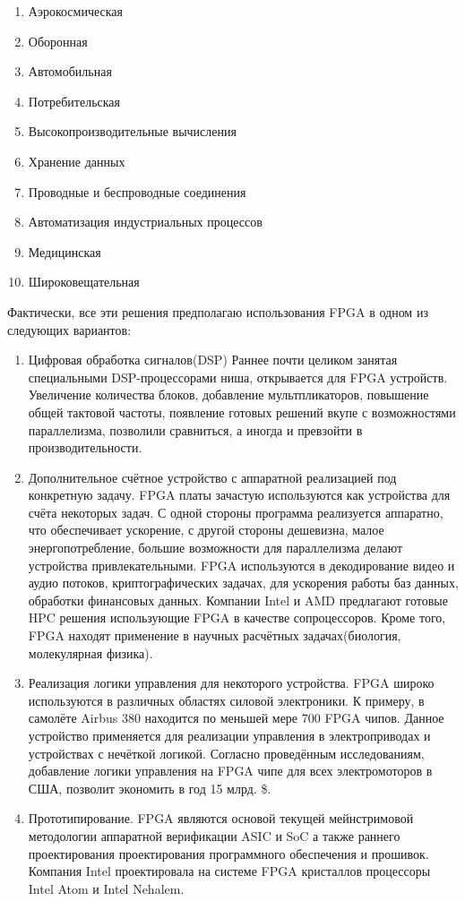 \begin{enumerate}
	\item Аэрокосмическая
	\item Оборонная
	\item Автомобильная
	\item Потребительская
	\item Высокопроизводительные вычисления
	\item Хранение данных
	\item Проводные и беспроводные соединения
	\item Автоматизация индустриальных процессов
	\item Медицинская
	\item Широковещательная
\end{enumerate}

Фактически, все эти решения предполагаю использования FPGA в одном из следующих
вариантов:

\begin{enumerate}
  \item Цифровая обработка сигналов(DSP)
  		Раннее почти целиком занятая специальными DSP-процессорами ниша, открывается
  		для FPGA устройств. Увеличение количества блоков, добавление
  		мультпликаторов, повышение общей тактовой частоты, появление готовых решений
  		вкупе с возможностями параллелизма, позволили сравниться, а иногда и превзойти в
  		производительности. 
  \item Дополнительное счётное устройство с аппаратной реализацией под
  		конкретную задачу.
  		FPGA платы зачастую используются как устройства для счёта некоторых задач. С
  		одной стороны программа реализуется аппаратно, что обеспечивает ускорение, с
  		другой стороны дешевизна, малое энергопотребление, большие возможности для
  		параллелизма делают устройства привлекательными. FPGA используются в
  		декодирование видео и аудио потоков, криптографических задачах, для
  		ускорения работы баз данных, обработки финансовых данных. Компании Intel и
  		AMD предлагают готовые HPC решения использующие FPGA в качестве
  		сопроцессоров. Кроме того, FPGA находят применение в научных расчётных
  		задачах(биология, молекулярная физика).
  \item Реализация логики управления для некоторого устройства.
  		FPGA широко используются в различных областях силовой электроники. К
  		примеру, в самолёте Airbus 380 находится по меньшей мере 700 FPGA чипов. 
  		Данное устройство применяется для реализации управления в электроприводах и
  		устройствах с нечёткой логикой. Согласно проведённым исследованиям,
  		добавление логики управления на FPGA чипе для всех электромоторов в США,
  		позволит экономить в год 15 млрд. \$.
  \item Прототипирование.
  		FPGA являются основой текущей мейнстримовой методологии аппаратной
  		верификации ASIC и SoC а также раннего проектирования проектирования
  		программного обеспечения и прошивок. Компания Intel проектировала на системе
  		FPGA кристаллов процессоры Intel Atom и Intel Nehalem. 
\end{enumerate}